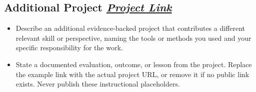 \documentclass[letterpaper,10pt]{article}
\begin{document}
\subsection*{Additional Project \hfill \textit{\href{https://example.com}{Project Link}}}
\begin{itemize}
\item Describe an additional evidence-backed project that contributes a different relevant skill or perspective, naming the tools or methods you used and your specific responsibility for the work.
\item State a documented evaluation, outcome, or lesson from the project. Replace the example link with the actual project URL, or remove it if no public link exists. Never publish these instructional placeholders.
\end{itemize}
\end{document}
